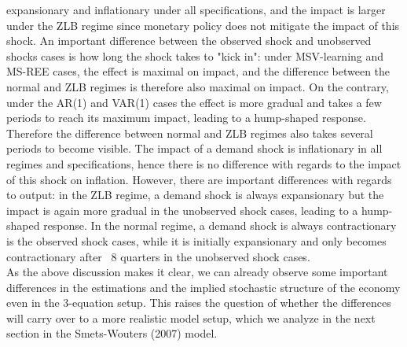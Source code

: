 \documentclass[12pt,reqno]{article}
\numberwithin{equation}{section}
\begin{document}
expansionary and inflationary under all specifications, and the impact is larger under the ZLB regime since monetary policy does not mitigate the impact of this shock. An important difference between the observed shock and unobserved shocks cases is how long the shock takes to "kick in": under MSV-learning and MS-REE cases, the effect is maximal on impact, and the difference between the normal and ZLB regimes is therefore also maximal on impact. On the contrary, under the AR(1) and VAR(1) cases the effect is more gradual and takes a few periods to reach its maximum impact, leading to a hump-shaped response. Therefore the difference between normal and ZLB regimes also takes several periods to become visible. The impact of a demand shock is inflationary in all regimes and specifications, hence there is no difference with regards to the impact of this shock on inflation. However, there are important differences with regards to output: in the ZLB regime, a demand shock is always expansionary but the impact is again more gradual in the unobserved shock cases, leading to a hump-shaped response. In the normal regime, a demand shock is always contractionary is the observed shock cases, while it is initially expansionary and only becomes contractionary after ~8 quarters in the unobserved shock cases. \\
\noindent
As the above discussion makes it clear, we can already observe some important differences in the estimations and the implied stochastic structure of the economy even in the 3-equation setup. This raises the question of whether the differences will carry over to a more realistic model setup, which we analyze in the next section in the Smets-Wouters (2007) model. 
\end{document}
